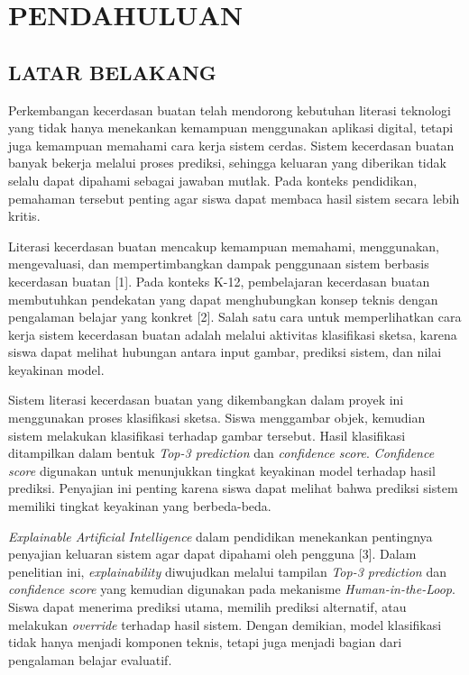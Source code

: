 \documentclass[10pt,twoside,openright]{report}
\begin{document}
\tableofcontents

\clearpage

\chapter{PENDAHULUAN}
\label{chap:bab1}

\section{LATAR BELAKANG}
\label{sec:latar-belakang}

Perkembangan kecerdasan buatan telah mendorong kebutuhan literasi teknologi yang tidak hanya menekankan kemampuan menggunakan aplikasi digital, tetapi juga kemampuan memahami cara kerja sistem cerdas. Sistem kecerdasan buatan banyak bekerja melalui proses prediksi, sehingga keluaran yang diberikan tidak selalu dapat dipahami sebagai jawaban mutlak. Pada konteks pendidikan, pemahaman tersebut penting agar siswa dapat membaca hasil sistem secara lebih kritis.

Literasi kecerdasan buatan mencakup kemampuan memahami, menggunakan, mengevaluasi, dan mempertimbangkan dampak penggunaan sistem berbasis kecerdasan buatan [1]. Pada konteks K-12, pembelajaran kecerdasan buatan membutuhkan pendekatan yang dapat menghubungkan konsep teknis dengan pengalaman belajar yang konkret [2]. Salah satu cara untuk memperlihatkan cara kerja sistem kecerdasan buatan adalah melalui aktivitas klasifikasi sketsa, karena siswa dapat melihat hubungan antara input gambar, prediksi sistem, dan nilai keyakinan model.

Sistem literasi kecerdasan buatan yang dikembangkan dalam proyek ini menggunakan proses klasifikasi sketsa. Siswa menggambar objek, kemudian sistem melakukan klasifikasi terhadap gambar tersebut. Hasil klasifikasi ditampilkan dalam bentuk \textit{Top-3 prediction} dan \textit{confidence score}. \textit{Confidence score} digunakan untuk menunjukkan tingkat keyakinan model terhadap hasil prediksi. Penyajian ini penting karena siswa dapat melihat bahwa prediksi sistem memiliki tingkat keyakinan yang berbeda-beda.

\textit{Explainable Artificial Intelligence} dalam pendidikan menekankan pentingnya penyajian keluaran sistem agar dapat dipahami oleh pengguna [3]. Dalam penelitian ini, \textit{explainability} diwujudkan melalui tampilan \textit{Top-3 prediction} dan \textit{confidence score} yang kemudian digunakan pada mekanisme \textit{Human-in-the-Loop}. Siswa dapat menerima prediksi utama, memilih prediksi alternatif, atau melakukan \textit{override} terhadap hasil sistem. Dengan demikian, model klasifikasi tidak hanya menjadi komponen teknis, tetapi juga menjadi bagian dari pengalaman belajar evaluatif.
\end{document}
